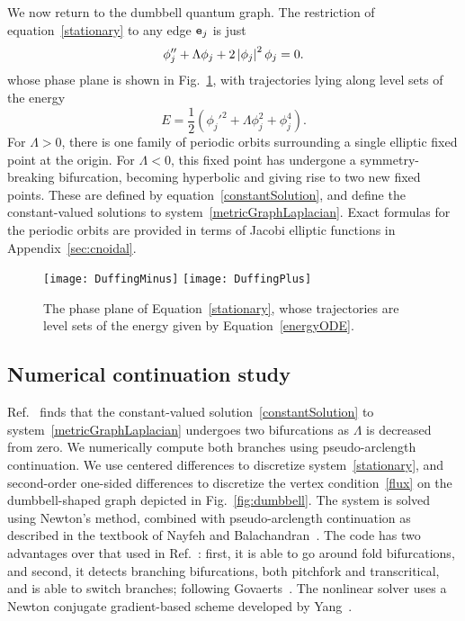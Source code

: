 \documentclass{article}
\numberwithin{equation}{section}
\numberwithin{figure}{section}
\begin{document}
We now return to the dumbbell quantum graph. The restriction of equation~\eqref{stationary} to any edge $\mathtt{e}_j$ is just
\begin{equation}
\phi_j'' + \Lambda \phi_j + 2 \left\lvert\phi_j\right\rvert^2 \phi_j = 0.
\label{stationaryEdge}
\end{equation}
 whose phase plane is shown in Fig.~\ref{fig:phaseplane}, with trajectories lying along level sets of the energy
\begin{equation}
E = \frac{1}{2} \left(\phi_j'^2 + \Lambda \phi_j^2 + \phi_j^4 \right).
\label{energyODE}
\end{equation}
For $\Lambda>0$, there is one family of periodic orbits surrounding a single elliptic fixed point at the origin. For $\Lambda<0$, this fixed point has undergone a symmetry-breaking bifurcation, becoming hyperbolic and giving rise to two new fixed points. These are  defined by equation~\eqref{constantSolution}, and define the constant-valued solutions to system~\eqref{metricGraphLaplacian}. Exact formulas for the periodic orbits are provided in terms of Jacobi elliptic functions in Appendix~\ref{sec:cnoidal}.



\begin{figure}[htbp] %
   \centering
   \texttt{[image: DuffingMinus]}
   \texttt{[image: DuffingPlus]}
   \caption{The phase plane of Equation~\eqref{stationary}, whose trajectories are level sets of the energy given by Equation~\eqref{energyODE}.}
\label{fig:phaseplane}
\end{figure}

\subsection{Numerical continuation study}
Ref.~\cite{Marzuola:2016bl} finds that the constant-valued solution~\eqref{constantSolution} to system~\eqref{metricGraphLaplacian} undergoes two bifurcations as $\Lambda$ is decreased from zero. We numerically compute both branches using pseudo-arclength continuation. We use centered differences to discretize system~\eqref{stationary}, and second-order one-sided differences to discretize the vertex condition~\eqref{flux} on the dumbbell-shaped graph depicted in Fig.~\ref{fig:dumbbell}. The system is solved using Newton's method, combined with pseudo-arclength continuation as described in the textbook of Nayfeh and Balachandran~\cite{nayfeh2008applied}. The code has two advantages over that used in Ref.~\cite{Marzuola:2016bl}: first, it is able to go around fold bifurcations, and second, it detects branching bifurcations, both pitchfork and transcritical, and is able to switch branches; following Govaerts~\cite{Govaerts:2000vv}. The nonlinear solver uses a Newton conjugate gradient-based scheme developed by Yang~\cite{Yang:2009}.
\end{document}
